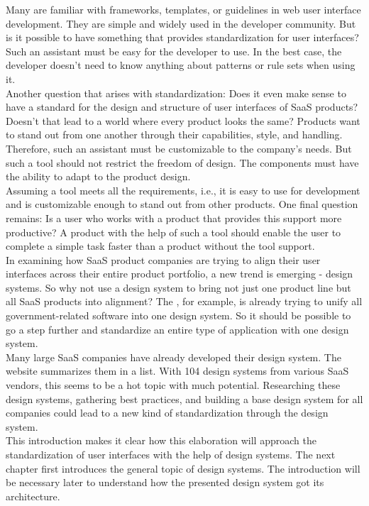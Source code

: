 Many are familiar with frameworks, templates, or guidelines in web user interface development. They are simple and widely used in the developer community. But is it possible to have something that provides standardization for user interfaces? Such an assistant must be easy for the developer to use. In the best case, the developer doesn't need to know anything about patterns or rule sets when using it. \\
Another question that arises with standardization: Does it even make sense to have a standard for the design and structure of user interfaces of \ac{SaaS} products? Doesn't that lead to a world where every product looks the same? Products want to stand out from one another through their capabilities, style, and handling. Therefore, such an assistant must be customizable to the company's needs. But such a tool should not restrict the freedom of design. The components must have the ability to adapt to the product design. \\
Assuming a tool meets all the requirements, i.e., it is easy to use for development and is customizable enough to stand out from other products. One final question remains: Is a user who works with a product that provides this support more productive? A product with the help of such a tool should enable the user to complete a simple task faster than a product without the tool support. \\
In examining how \ac{SaaS} product companies are trying to align their user interfaces across their entire product portfolio, a new trend is emerging - design systems. So why not use a design system to bring not just one product line but all \ac{SaaS} products into alignment? The , for example, is already trying to unify all government-related software into one design system. So it should be possible to go a step further and standardize an entire type of application with one design system. \\
Many large \ac{SaaS} companies have already developed their design system. The  website summarizes them in a list. With 104 design systems from various \ac{SaaS} vendors, this seems to be a hot topic with much potential. Researching these design systems, gathering best practices, and building a base design system for all companies could lead to a new kind of standardization through the design system. \\

This introduction makes it clear how this elaboration will approach the standardization of user interfaces with the help of design systems. The next chapter first introduces the general topic of design systems. The introduction will be necessary later to understand how the presented design system got its architecture. 